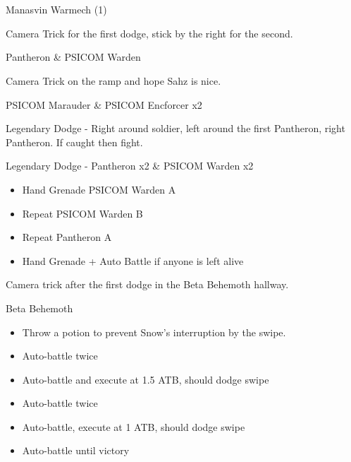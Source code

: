 \chapter{}

\begin{battle}{Manasvin Warmech (1)}
\end{battle}

Camera Trick for the first dodge, stick by the right for the second.

\begin{battle}{Pantheron \& PSICOM Warden}
\end{battle}

Camera Trick on the ramp and hope Sahz is nice.

\begin{battle}{PSICOM Marauder \& PSICOM Encforcer x2}
\end{battle}

Legendary Dodge - Right around soldier, left around the first Pantheron, right Pantheron. If caught then fight.

\begin{battle}{Legendary Dodge - Pantheron x2 \& PSICOM Warden x2}
\begin{itemize}
    \item Hand Grenade PSICOM Warden A
    \item Repeat PSICOM Warden B
    \item Repeat Pantheron A
    \item Hand Grenade + Auto Battle if anyone is left alive
\end{itemize}

\end{battle}

Camera trick after the first dodge in the Beta Behemoth hallway.

\begin{battle}{Beta Behemoth}
\begin{itemize}
    \item Throw a potion to prevent Snow's interruption by the swipe.
    \item Auto-battle twice
    \item Auto-battle and execute at 1.5 ATB, should dodge swipe
    \item Auto-battle twice
    \item Auto-battle, execute at 1 ATB, should dodge swipe
    \item Auto-battle until victory
\end{itemize}
\end{battle}

